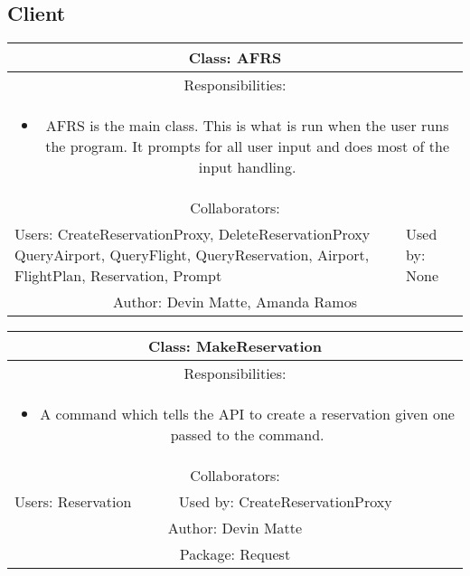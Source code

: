 \subsection{Client}\label{subsec:client}

\begin{center}
    \begin{tabular}{ |p{7cm}|p{7cm}|  }
        \hline
        \multicolumn{2}{|c|}{Class: AFRS} \\
        \hline
        \multicolumn{2}{|c|}{Responsibilities:} \\ \multicolumn{2}{|c|}{\parbox{0.9\textwidth}{
        \begin{itemize}
            \item AFRS is the main class. This is what is run when the user runs the program. It prompts for all user input and does most of the input handling.
        \end{itemize} }} \\
        \hline
        \multicolumn{2}{|c|}{Collaborators:} \\
        \hline
        Users: CreateReservationProxy, DeleteReservationProxy QueryAirport, QueryFlight, QueryReservation, Airport, FlightPlan, Reservation, Prompt & Used by: None \\
        \hline
        \multicolumn{2}{|c|}{Author: Devin Matte, Amanda Ramos} \\
        \hline
    \end{tabular}
\end{center}

\begin{center}
    \begin{tabular}{ |p{7cm}|p{7cm}|  }
        \hline
        \multicolumn{2}{|c|}{Class: MakeReservation} \\
        \hline
        \multicolumn{2}{|c|}{Responsibilities:} \\ \multicolumn{2}{|c|}{\parbox{0.9\textwidth}{
        \begin{itemize}
            \item A command which tells the API to create a reservation given one passed to the command.
        \end{itemize} }} \\
        \hline
        \multicolumn{2}{|c|}{Collaborators:} \\
        \hline
        Users: Reservation & Used by: CreateReservationProxy \\
        \hline
        \multicolumn{2}{|c|}{Author: Devin Matte} \\
        \hline
        \multicolumn{2}{|c|}{Package: Request} \\
        \hline
    \end{tabular}
\end{center}

